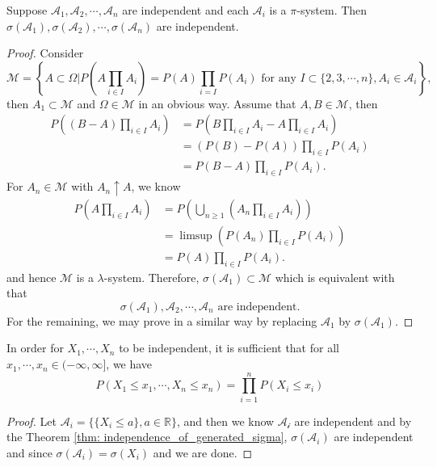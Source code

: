 \begin{theorem}
\label{thm: independence_of_generated_sigma}
    Suppose $\mathcal{A}_1, \mathcal{A}_2, \cdots , \mathcal{A}_n$ are independent and each $\mathcal{A}_i$
is a $\pi$-system. Then $\sigma(\mathcal{A}_1), \sigma(\mathcal{A}_2), \cdots , \sigma(\mathcal{A}_n)$ are independent.
\end{theorem}
\begin{proof}
    Consider
    \[
    \mathcal{M} = \left\{A \subset \Omega| P\left(A\prod_{i\in I} A_i\right) = P(A)\prod_{i=I}P(A_i)\text{ for any }I\subset\{2,3,\cdots,n\},A_i \in \mathcal{A}_i \right\},
    \]
    then $A_1 \subset \mathcal{M}$ and $\Omega \in \mathcal{M}$ in an obvious way. Assume that $A,B \in \mathcal{M}$, then
    \[
    \begin{aligned}
    P\left((B-A)\prod_{i\in I} A_i\right) &= P\left(B\prod_{i\in I} A_i - A\prod_{i\in I} A_i\right) \\ &= \left(P(B)-P(A)\right)\prod_{i\in I} P(A_i) \\ &= P(B-A)\prod_{i\in I} P(A_i).
    \end{aligned}
    \]
    For $A_n \in \mathcal{M}$ with $A_n \uparrow A$, we know
    \[
    \begin{aligned}
    P\left(A\prod_{i\in I} A_i\right) &= P\left(\bigcup_{n\geq 1} \left(A_n \prod_{i\in I} A_i\right) \right) \\ &= \limsup \left(P(A_n)\prod_{i\in I}P\left(A_i\right)\right) \\ &= P(A)\prod_{i\in I} P(A_i).
    \end{aligned}
    \]
    and hence $\mathcal{M}$ is a $\lambda$-system. Therefore, $\sigma(\mathcal{A}_1)\subset \mathcal{M}$ which is equivalent with that \[\sigma(\mathcal{A}_1), \mathcal{A}_2,\cdots,\mathcal{A}_n \text{ are independent}.\]
    For the remaining, we may prove in a similar way by replacing $\mathcal{A}_1$ by $\sigma(\mathcal{A}_1)$.
\end{proof}

\begin{proposition}
    In order for $X_1, \cdots , X_n$ to be independent, it is sufficient that for all $x_1, \cdots , x_n \in (−\infty,\infty]$, we have
\[P(X_1 \leq x_1, \cdots , X_n \leq x_n) = \prod_{i=1}^n P(X_i \leq x_i)\]
\end{proposition}
\begin{proof}
    Let $\mathcal{A}_i = \{\{X_i \leq a\}, a\in\mathbb{R}\}$, and then we know $\mathcal{A_i}$ are independent and by the Theorem \ref{thm: independence_of_generated_sigma}, $\sigma(\mathcal{A}_i)$ are independent and since $\sigma(\mathcal{A}_i) = \sigma(X_i)$ and we are done.
\end{proof}

